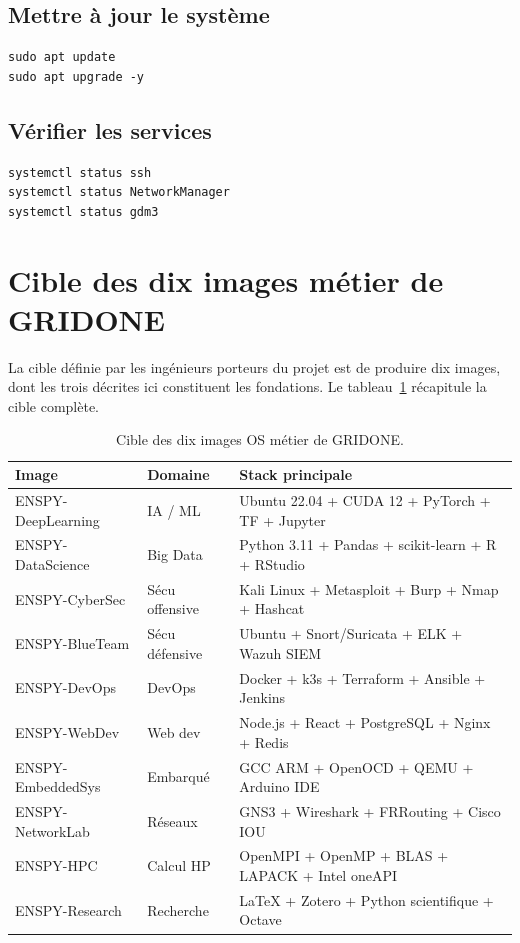 \subsection{Mettre à jour le système}

\begin{lstlisting}[basicstyle=\ttfamily\footnotesize, frame=single]
sudo apt update
sudo apt upgrade -y
\end{lstlisting}

\subsection{Vérifier les services}

\begin{lstlisting}[basicstyle=\ttfamily\footnotesize, frame=single]
systemctl status ssh
systemctl status NetworkManager
systemctl status gdm3
\end{lstlisting}

\section{Cible des dix images métier de GRIDONE}

La cible définie par les ingénieurs porteurs du projet est de produire dix images, dont les trois décrites ici constituent les fondations. Le tableau~\ref{tab:images-cible} récapitule la cible complète.

\begin{table}[H]
\centering
\small
\begin{tabular}{lll}
\toprule
\textbf{Image} & \textbf{Domaine} & \textbf{Stack principale} \\
\midrule
ENSPY-DeepLearning & IA / ML        & Ubuntu 22.04 + CUDA 12 + PyTorch + TF + Jupyter \\
ENSPY-DataScience  & Big Data       & Python 3.11 + Pandas + scikit-learn + R + RStudio \\
ENSPY-CyberSec     & Sécu offensive & Kali Linux + Metasploit + Burp + Nmap + Hashcat \\
ENSPY-BlueTeam     & Sécu défensive & Ubuntu + Snort/Suricata + ELK + Wazuh SIEM \\
ENSPY-DevOps       & DevOps         & Docker + k3s + Terraform + Ansible + Jenkins \\
ENSPY-WebDev       & Web dev        & Node.js + React + PostgreSQL + Nginx + Redis \\
ENSPY-EmbeddedSys  & Embarqué       & GCC ARM + OpenOCD + QEMU + Arduino IDE \\
ENSPY-NetworkLab   & Réseaux        & GNS3 + Wireshark + FRRouting + Cisco IOU \\
ENSPY-HPC          & Calcul HP      & OpenMPI + OpenMP + BLAS + LAPACK + Intel oneAPI \\
ENSPY-Research     & Recherche      & LaTeX + Zotero + Python scientifique + Octave \\
\bottomrule
\end{tabular}
\caption{Cible des dix images OS métier de GRIDONE.}
\label{tab:images-cible}
\end{table}

